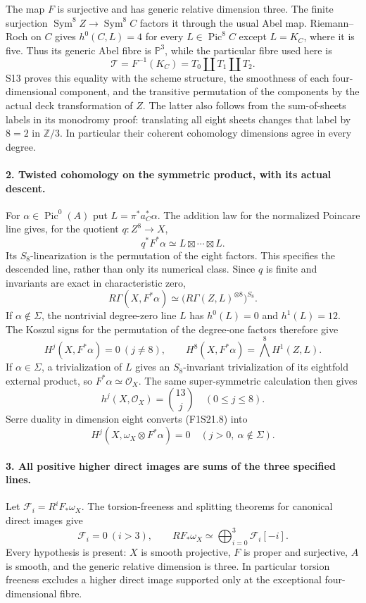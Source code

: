 The map $F$ is surjective and has generic relative dimension
three. The finite surjection
$\operatorname{Sym}^8 Z\to\operatorname{Sym}^8 C$ factors it
through the usual Abel map. Riemann--Roch on $C$ gives
$h^0(C,L)=4$ for every $L\in\operatorname{Pic}^8 C$ except
$L=K_C$, where it is five. Thus its generic Abel fibre is
$\mathbb P^3$, while the particular fibre used here is
\[
 \mathcal T=F^{-1}(K_C)=T_0\amalg T_1\amalg T_2.
 \tag{F1S21.5}
\]
S13 proves this equality with the scheme structure, the
smoothness of each four-dimensional component, and the
transitive permutation of the components by the actual
deck transformation of $Z$. The latter also follows from
the sum-of-sheets labels in its monodromy proof: translating
all eight sheets changes that label by $8=2$ in
$\mathbb Z/3$. In particular their coherent cohomology
dimensions agree in every degree.

\paragraph{2. Twisted cohomology on the symmetric product, with its actual descent.}
For $\alpha\in\operatorname{Pic}^0(A)$ put
$L=\pi^*a_C^*\alpha$. The addition law for the normalized
Poincare line gives, for the quotient $q:Z^8\to X$,
\[
 q^*F^*\alpha\simeq L\boxtimes\cdots\boxtimes L.
 \tag{F1S21.6}
\]
Its $S_8$-linearization is the permutation of the eight
factors. This specifies the descended line, rather than
only its numerical class. Since $q$ is finite and invariants
are exact in characteristic zero,
\[
 R\Gamma(X,F^*\alpha)\simeq
       \bigl(R\Gamma(Z,L)^{\otimes8}\bigr)^{S_8}.
 \tag{F1S21.7}
\]
If $\alpha\notin\Sigma$, the nontrivial degree-zero line
$L$ has $h^0(L)=0$ and $h^1(L)=12$. The Koszul signs for
the permutation of the degree-one factors therefore give
\[
 H^j(X,F^*\alpha)=0\ (j\ne8),\qquad
 H^8(X,F^*\alpha)=\bigwedge^8 H^1(Z,L).
 \tag{F1S21.8}
\]
If $\alpha\in\Sigma$, a trivialization of $L$ gives an
$S_8$-invariant trivialization of its eightfold external
product, so $F^*\alpha\simeq\mathcal O_X$. The same
super-symmetric calculation then gives
\[
 h^j(X,\mathcal O_X)=\binom{13}{j}\quad(0\le j\le8).
 \tag{F1S21.9}
\]
Serre duality in dimension eight converts (F1S21.8) into
\[
 H^j(X,\omega_X\otimes F^*\alpha)=0
       \quad(j>0,\ \alpha\notin\Sigma).
 \tag{F1S21.10}
\]

\paragraph{3. All positive higher direct images are sums of the three specified lines.}
Let $\mathcal F_i=R^iF_*\omega_X$. The torsion-freeness
and splitting theorems for canonical direct images give
\[
 \mathcal F_i=0\ (i>3),\qquad
 RF_*\omega_X\simeq\bigoplus_{i=0}^3\mathcal F_i[-i].
 \tag{F1S21.11}
\]
Every hypothesis is present: $X$ is smooth projective,
$F$ is proper and surjective, $A$ is smooth, and the
generic relative dimension is three. In particular
torsion freeness excludes a higher direct image supported
only at the exceptional four-dimensional fibre.

